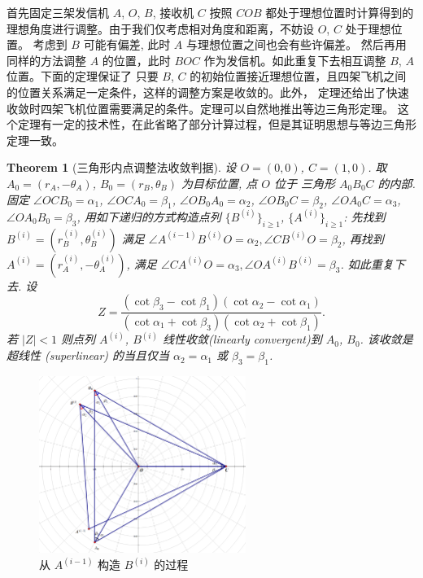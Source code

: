 \documentclass{my_paper}
\newtheorem{theorem}{Theorem}
\begin{document}
首先固定三架发信机 $A$, $O$, $B$, 接收机 $C$ 按照 $COB$ 
都处于理想位置时计算得到的理想角度进行调整。由于我们仅考虑相对角度和距离，不妨设 $O$, $C$ 处于理想位置。
考虑到 $B$ 可能有偏差, 此时 $A$ 与理想位置之间也会有些许偏差。
然后再用同样的方法调整 $A$ 的位置，此时 $BOC$ 作为发信机。如此重复下去相互调整 $B$, $A$ 位置。下面的定理保证了
只要 $B$, $C$ 的初始位置接近理想位置，且四架飞机之间的位置关系满足一定条件，这样的调整方案是收敛的。此外，
定理还给出了快速收敛时四架飞机位置需要满足的条件。定理可以自然地推出等边三角形定理。
这个定理有一定的技术性，在此省略了部分计算过程，但是其证明思想与等边三角形定理一致。 
\begin{theorem}[三角形内点调整法收敛判据]
    \label{remarkable}
    设 $O=(0,0)$, $C=(1,0)$. 取 $A_0=(r_A, -\theta_A)$, $B_0 = (r_B,\theta_B)$ 为目标位置, 点 $O$ 位于
    三角形 $A_0B_0C$ 的内部.
    固定 $\angle OCB_0=\alpha_1$, $\angle OCA_0=\beta_1$, $\angle OB_0A_0=\alpha_2$, $\angle OB_0C=\beta_2$,
    $\angle OA_0C=\alpha_3$, $\angle OA_0B_0=\beta_3$,  
    用如下递归的方式构造点列 $\{B^{(i)}\}_{i\geq 1}$, $\{A^{(i)}\}_{i\geq 1}$: 先找到
    $B^{(i)}=(r_B^{(i)},\theta_B^{(i)})$ 满足 $\angle A^{(i-1)}B^{(i)}O=\alpha_2, \angle CB^{(i)}O=\beta_2$, 再找到
    $A^{(i)}=(r_A^{(i)},-\theta_A^{(i)})$, 满足 $\angle CA^{(i)}O=\alpha_3, \angle OA^{(i)}B^{(i)}=\beta_3$. 如此重复下去.
    设 
    $$
        Z = \frac{(\cot \beta_3-\cot\beta_1)(\cot \alpha_2-\cot \alpha_1)}
        {(\cot \alpha_1+\cot \beta_3)(\cot \alpha_2+\cot \beta_1)}.
    $$
    若 $|Z|< 1$ 则点列 $A^{(i)}$, $B^{(i)}$ 线性收敛(linearly convergent)到 $A_0$, $B_0$. 
    该收敛是超线性 (superlinear) 的当且仅当 $\alpha_2=\alpha_1$ 或 $\beta_3=\beta_1$. 
\end{theorem}
\begin{figure}[H]
    \centering
    \includegraphics[width=0.6\textwidth]{sketch4}
    \caption{从 $A^{(i-1)}$ 构造 $B^{(i)}$ 的过程} 
\end{figure}
\end{document}
